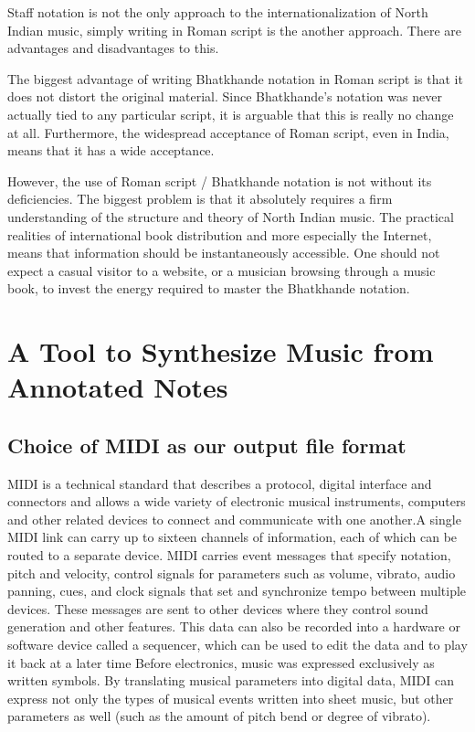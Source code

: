 \documentclass[12pt,a4paper]{article}
\begin{document}
Staff notation is not the only approach to the internationalization of North Indian music, simply writing in Roman script is the another approach.  There are advantages and disadvantages to this.

The biggest advantage of writing Bhatkhande notation in Roman script is that it does not distort the original material.  Since Bhatkhande's notation was never actually tied to any particular script, it is arguable that this is really no change at all.  Furthermore, the widespread acceptance of Roman script, even in India, means that it has a wide acceptance.

However, the use of Roman script / Bhatkhande notation is not without its deficiencies.  The biggest problem is that it absolutely requires a firm understanding of the structure and theory of North Indian music.  The practical realities of international book distribution and more especially the Internet, means that information should be instantaneously accessible.  One should not expect a casual visitor to a website, or a musician browsing through a music book, to invest the energy required to master the Bhatkhande notation.



\section{A Tool to Synthesize Music from Annotated Notes}

\subsection{Choice of MIDI as our output file format}
MIDI is a technical standard that describes a protocol, digital interface and connectors and allows a wide variety of electronic musical instruments, computers and other related devices to connect and communicate with one another.A single MIDI link can carry up to sixteen channels of information, each of which can be routed to a separate device.
MIDI carries event messages that specify notation, pitch and velocity, control signals for parameters such as volume, vibrato, audio panning, cues, and clock signals that set and synchronize tempo between multiple devices. These messages are sent to other devices where they control sound generation and other features. This data can also be recorded into a hardware or software device called a sequencer, which can be used to edit the data and to play it back at a later time
Before electronics, music was expressed exclusively as written symbols. By translating musical parameters into digital data, MIDI can express not only the types of musical events written into sheet music, but other parameters as well (such as the amount of pitch bend or degree of vibrato).
\end{document}
